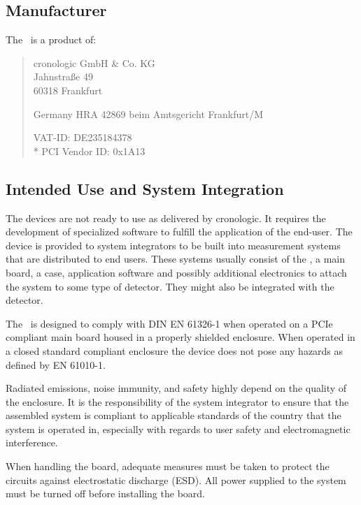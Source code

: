 \subsection{Manufacturer\label{cp:manu}}

The \deviceName\ is a product of:\

\begin{quote}
    cronologic GmbH \& Co. KG\\
    Jahnstra\ss{}e 49\\
    60318 Frankfurt\par
    Germany
    \noindent HRA 42869 beim Amtsgericht Frankfurt/M\par
    \noindent VAT-ID: DE235184378 \\*
    \noindent PCI Vendor ID: 0x1A13
\end{quote}

\subsection{Intended Use and System Integration}
The devices are not ready to use as delivered by cronologic. It requires the
development of specialized software to fulfill the application of the
end-user. The device is provided to system integrators to be built into
measurement systems that are distributed to end users. These systems usually
consist of the \deviceName, a main board, a case, application software and
possibly additional electronics to attach the system to some type of detector.
They might also be integrated with the detector.\par

The \deviceName\ is designed to comply with DIN EN 61326-1 when operated on a
PCIe compliant main board housed in a properly shielded enclosure.  When
operated in a closed standard compliant enclosure the device does not pose any
hazards as defined by EN 61010-1.\par

Radiated emissions, noise immunity, and safety highly depend on the quality of
the enclosure.  It is the responsibility of the system integrator to ensure
that the assembled system is compliant to applicable standards of the country
that the system is operated in, especially with regards to user safety and
electromagnetic interference. \par
    
When handling the board, adequate measures must be taken to protect the
circuits against electrostatic discharge (ESD). All power supplied to the
system must be turned off before installing the board.

